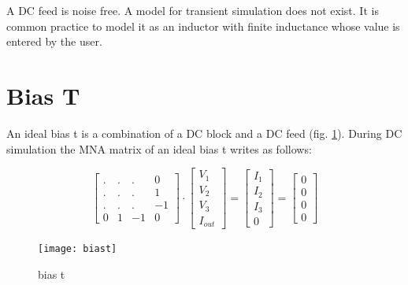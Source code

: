 A DC feed is noise free. A model for transient simulation does not
exist. It is common practice to model it as an inductor with finite
inductance whose value is entered by the user.


\section{Bias T}

An ideal bias t is a combination of a DC block and a DC feed
(fig. \ref{fig:biast}). During DC simulation the MNA matrix
of an ideal bias t writes as follows:

\begin{equation}
\begin{bmatrix}
 . & . & .  &  0\\
 . & . & .  &  1\\
 . & . & .  & -1\\
 0 & 1 & -1 &  0
\end{bmatrix}
\cdot
\begin{bmatrix}
V_{1}\\
V_{2}\\
V_{3}\\
I_{out}
\end{bmatrix}
=
\begin{bmatrix}
I_{1}\\
I_{2}\\
I_{3}\\
0
\end{bmatrix}
=
\begin{bmatrix}
0\\
0\\
0\\
0
\end{bmatrix}
\end{equation}

\begin{figure}[ht]
\begin{center}
\texttt{[image: biast]}
\end{center}
\caption{bias t}
\label{fig:biast}
\end{figure}
\FloatBarrier


